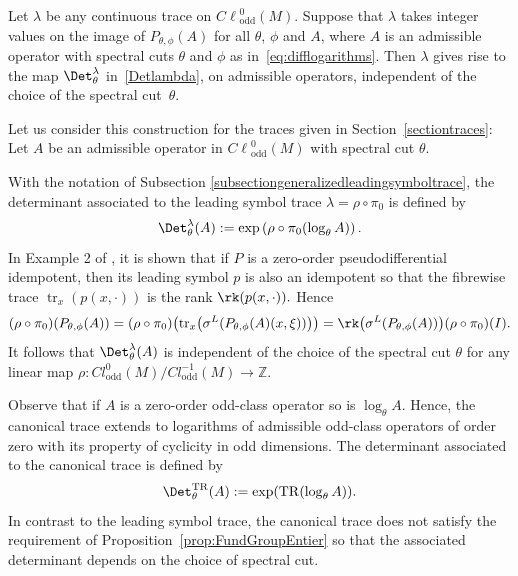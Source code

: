 \documentclass[pdftex]{sigma}
\DeclareMathOperator{\TR}{TR} \DeclareMathOperator{\Op}{Op}
\DeclareMathOperator{\odd}{odd} \DeclareMathOperator{\supp}{supp}
\DeclareMathOperator{\tr}{tr} \DeclareMathOperator{\Log}{Log}
\newcommand{\Z}{{\mathbb Z}}
\def \Cl {{C\ell}}
\begin{document}
\begin{proposition}\label{prop:FundGroupEntier}
Let $\lambda$ be any continuous trace on $\Cl_{\odd}^{0}(M)$. Suppose that $\lambda$ takes integer values on the image of $P_{\theta, \phi}(A)$ for all $\theta$, $\phi$ and $A$, where $A$ is an admissible operator with spectral cuts $\theta$ and $\phi$ as in~\eqref{eq:difflogarithms}. Then $\lambda$ gives rise to the map ${\Det}_\theta^\lambda$ in~\eqref{Detlambda}, on admissible operators, independent of the choice of the spectral cut~$\theta$.
\end{proposition}

Let us consider this construction for the traces given in Section~\ref{sectiontraces}: Let $A$ be an admissible operator in $\Cl_{\odd}^{0}(M)$  with spectral cut $\theta$.

 With the notation of Subsection \ref{subsectiongeneralizedleadingsymboltrace}, the determinant associated to the leading symbol trace $\lambda=\rho\circ\pi_0$ is def\/ined by
\[
 {\Det}_\theta^{\lambda}(A):={\exp}\left(\rho\circ\pi_0(\log_\theta A)\right).
\]
In Example 2 of \cite{lescure}, it is shown that if $P$ is a zero-order pseudodif\/ferential idempotent, then its leading symbol $p$ is also an idempotent so that the f\/ibrewise trace ${\tr}_x(p(x,\cdot))$ is the rank $\rk(p(x,\cdot)).$ Hence
\begin{gather*}
(\rho\circ\pi_0)(P_{\theta, \phi}(A)) =(\rho\circ\pi_0)\big({\tr}_x\big(\sigma^L(P_{\theta,\phi}(A)(x,\xi))\big)\big)
 =\rk\big(\sigma^L(P_{\theta, \phi}(A))\big)(\rho\circ\pi_0)(I).
\end{gather*}
It follows that ${\Det}_\theta^{\lambda}(A)$ is independent of the choice of the spectral cut $\theta$ for any linear map $\rho:Cl^{0}_{\odd}(M)/Cl^{-1}_{\odd}(M)\to\Z$.

 Observe that if $A$ is a zero-order odd-class operator so is $\log_\theta A$. Hence, the canonical trace extends to logarithms of admissible odd-class operators of order zero with its property of cyclicity in odd dimensions. The determinant associated to the canonical trace is def\/ined by
\begin{gather}
{\Det}_{\theta}^{\TR}(A):= {\exp}({{\TR}(\log_\theta A)}). \label{DetthetaTR}
\end{gather}
In contrast to the leading symbol trace, the canonical trace does not satisfy the requirement of Proposition~\ref{prop:FundGroupEntier} so that the associated determinant depends on the choice of spectral cut.
\end{document}
